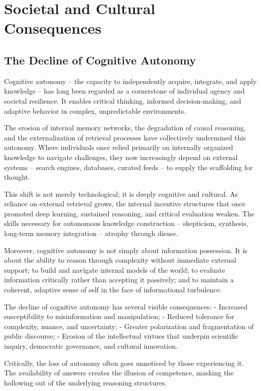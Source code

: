 \chapter{Societal and Cultural Consequences}

\section{The Decline of Cognitive Autonomy}

Cognitive autonomy -- the capacity to independently acquire, integrate,
and apply knowledge -- has long been regarded as a cornerstone of
individual agency and societal resilience. It enables critical thinking,
informed decision-making, and adaptive behavior in complex,
unpredictable environments.

The erosion of internal memory networks, the degradation of causal
reasoning, and the externalization of retrieval processes have
collectively undermined this autonomy. Where individuals once relied
primarily on internally organized knowledge to navigate challenges, they
now increasingly depend on external systems -- search engines, databases,
curated feeds -- to supply the scaffolding for thought.

This shift is not merely technological; it is deeply cognitive and
cultural. As reliance on external retrieval grows, the internal
incentive structures that once promoted deep learning, sustained
reasoning, and critical evaluation weaken. The skills necessary for
autonomous knowledge construction -- skepticism, synthesis, long-term
memory integration -- atrophy through disuse.

Moreover, cognitive autonomy is not simply about information possession.
It is about the ability to reason through complexity without immediate
external support; to build and navigate internal models of the world; to
evaluate information critically rather than accepting it passively; and
to maintain a coherent, adaptive sense of self in the face of
informational turbulence.

The decline of cognitive autonomy has several visible consequences: -
Increased susceptibility to misinformation and manipulation; - Reduced
tolerance for complexity, nuance, and uncertainty; - Greater
polarization and fragmentation of public discourse; - Erosion of the
intellectual virtues that underpin scientific inquiry, democratic
governance, and cultural innovation.

Critically, the loss of autonomy often goes unnoticed by those
experiencing it. The availability of answers creates the illusion of
competence, masking the hollowing out of the underlying reasoning
structures.

